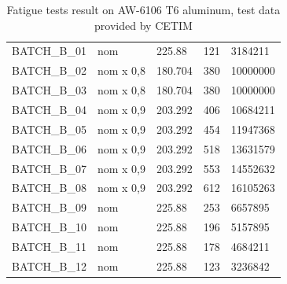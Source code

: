 \documentclass[3p,times,procedia,number]{elsarticle}
\begin{document}
\begin{table}[!h]
\begin{tabular}{lllll}
		BATCH\_B\_01      & nom                & 225.88                               & 121                                      & 3184211                              \\
		BATCH\_B\_02      & nom x 0,8          & 180.704                              & 380                                      & 10000000                             \\
		BATCH\_B\_03      & nom x 0,8          & 180.704                              & 380                                      & 10000000                             \\
		BATCH\_B\_04      & nom x 0,9          & 203.292                              & 406                                      & 10684211                             \\
		BATCH\_B\_05      & nom x 0,9          & 203.292                              & 454                                      & 11947368                             \\
		BATCH\_B\_06      & nom x 0,9          & 203.292                              & 518                                      & 13631579                             \\
		BATCH\_B\_07      & nom x 0,9          & 203.292                              & 553                                      & 14552632                             \\
		BATCH\_B\_08      & nom x 0,9          & 203.292                              & 612                                      & 16105263                             \\
		BATCH\_B\_09      & nom                & 225.88                               & 253                                      & 6657895                              \\
		BATCH\_B\_10      & nom                & 225.88                               & 196                                      & 5157895                              \\
		BATCH\_B\_11      & nom                & 225.88                               & 178                                      & 4684211                              \\
		BATCH\_B\_12      & nom                & 225.88                               & 123                                      & 3236842                              \\ \hline
	\end{tabular}
	\caption{Fatigue tests result on AW-6106 T6 aluminum, test data provided by CETIM}
	\label{tab:Cetim}
\end{table}
\end{document}
